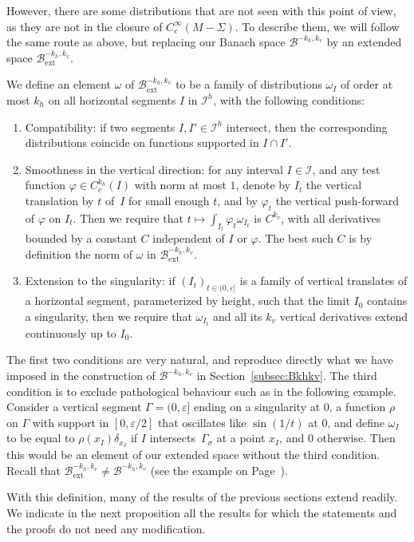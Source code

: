 \documentclass[10pt]{amsart}
\newcommand{\ext}{\mathrm{ext}}
\newcommand{\boI}{\mathcal{I}}
\newcommand{\boB}{\mathcal{B}}
\let\epsilon\varepsilon
\let\phi\varphi
\theoremstyle{definition}
\numberwithin{equation}{section}
\begin{document}
However, there are some distributions that are not seen with this point of
view, as they are not in the closure of $C^\infty_c(M-\Sigma)$. To describe
them, we will follow the same route as above, but replacing our Banach space
$\boB^{-k_h, k_v}$ by an extended space $\boB_{\ext}^{-k_h, k_v}$.

\enlargethispage{-2.5\baselineskip}%
We define an element $\omega$ of $\boB_{\ext}^{-k_h, k_v}$ to be a family of
distributions $\omega_I$ of order at most $k_h$ on all horizontal segments
$I$ in $\boI^h$, with the following conditions:
\begin{enumerate}
\item Compatibility: if two segments $I, I'\in \boI^h$ intersect, then the
corresponding distributions coincide on functions supported in $I\cap
I'$.
\item Smoothness in the vertical direction: for any interval $I \in \boI$,
and any test function $\phi \in C^{k_h}_c(I)$ with norm at most $1$,
denote by $I_t$ the vertical translation by $t$ of~$I$ for small enough
$t$, and by $\phi_t$ the vertical push-forward of $\phi$ on $I_t$. Then
we require that $t\mapsto \int_{I_t} \phi_t \omega_{I_t}$ is $C^{k_v}$,
with all derivatives bounded by a constant $C$ independent of $I$ or
$\phi$. The best such $C$ is by definition the norm of $\omega$ in
$\boB_{\ext}^{-k_h, k_v}$.
\item Extension to the singularity: if $(I_t)_{t \in (0,\epsilon]}$ is a
family of vertical translates of a horizontal segment, parameterized by
height, such that the limit $I_0$ contains a singularity, then we
require that $\omega_{I_t}$ and all its $k_v$ vertical derivatives
extend continuously up to $I_0$.
\end{enumerate}
The first two conditions are very natural, and reproduce directly what we
have imposed in the construction of $\boB^{-k_h, k_v}$ in
Section~\ref{subsec:Bkhkv}. The third condition is to exclude pathological
behaviour such as in the following example. Consider a vertical segment
$\Gamma= (0,\epsilon]$ ending on a singularity at $0$, a function $\rho$ on
$\Gamma$ with support in $[0,\epsilon/2]$ that oscillates like $\sin(1/t)$ at
$0$, and define $\omega_I$ to be equal to $\rho(x_I) \delta_{x_I}$ if $I$
intersects~$\Gamma_\sigma$ at a point $x_I$, and $0$ otherwise. Then this
would be an element of our extended space without the third condition. Recall
that $\boB_{\ext}^{-k_h, k_v} \neq \boB^{-k_h, k_v}$ (see the example on
Page~\pageref{page_B_ext_not_B}).

With this definition, many of the results of the previous sections extend
readily. We indicate in the next proposition all the results for which the
statements and the proofs do not need any modification.
\end{document}
